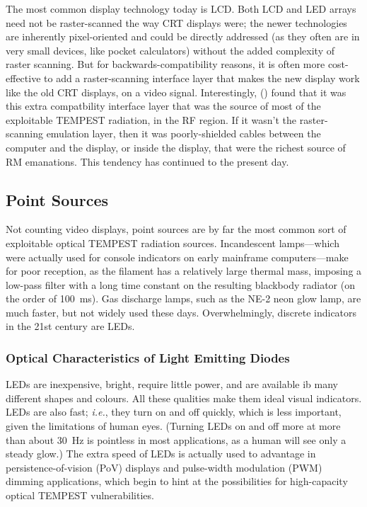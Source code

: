 \documentclass[a4paper,twoside,11pt]{book}
\begin{document}
The most common display technology today is LCD. Both LCD and LED arrays need
not be raster-scanned the way CRT displays were; the newer technologies are
inherently pixel-oriented and could be directly addressed (as they often are in
very small devices, like pocket calculators) without the added complexity of
raster scanning. But for backwards-compatibility reasons, it is often more
cost-effective to add a raster-scanning interface layer that makes the new
display work like the old CRT displays, on a video signal. Interestingly,
\citeauthor{Kuhn2002} (\citeyear{Kuhn2002}) found that it was this extra
compatbility interface layer that was the source of most of the exploitable
TEMPEST radiation, in the RF region. If it wasn't the raster-scanning emulation
layer, then it was poorly-shielded cables between the computer and the display,
or inside the display, that were the richest source of RM emanations. This
tendency has continued to the present day.

\subsection{Point Sources}

Not counting video displays, point sources are by far the most common sort of
exploitable optical TEMPEST radiation sources. Incandescent lamps---which were
actually used for console indicators on early mainframe computers---make for
poor reception, as the filament has a relatively large thermal mass, imposing a
low-pass filter with a long time constant on the resulting blackbody radiator
(on the order of \SI{100}{\milli\second}). Gas discharge lamps, such as the
NE-2 neon glow lamp, are much faster, but not widely used these days.
Overwhelmingly, discrete indicators in the 21st century are LEDs.

\subsubsection{Optical Characteristics of Light Emitting Diodes}

LEDs are inexpensive, bright, require little power, and are available ib many
different shapes and colours. All these qualities make them ideal visual
indicators. LEDs are also fast; {\it i.e.}, they turn on and off quickly, which
is less important, given the limitations of human eyes. (Turning LEDs on and
off more at more than about \SI{30}{\hertz} is pointless in most applications,
as a human will see only a steady glow.) The extra speed of LEDs is actually
used to advantage in persistence-of-vision (PoV) displays and pulse-width
modulation (PWM) dimming applications, which begin to hint at the possibilities
for high-capacity optical TEMPEST vulnerabilities.
\end{document}
